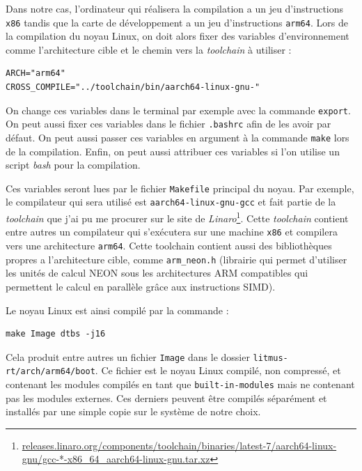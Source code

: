 Dans notre cas, l'ordinateur qui réalisera la compilation a un jeu d'instructions \texttt{x86} tandis que la carte de développement a un jeu d'instructions \texttt{arm64}. Lors de la compilation du noyau Linux, on doit alors fixer des variables d’environnement comme l'architecture cible et le chemin vers la \textit{toolchain} à utiliser : 
\begin{lstlisting}[style=command, caption=Variables pour la compilation croisée du noyau Linux]
ARCH="arm64"
CROSS_COMPILE="../toolchain/bin/aarch64-linux-gnu-"
\end{lstlisting}

On change ces variables dans le terminal par exemple avec la commande \texttt{export}. On peut aussi fixer ces variables dans le fichier \texttt{.bashrc} afin de les avoir par défaut. On peut aussi passer ces variables en argument à la commande \texttt{make} lors de la compilation. Enfin, on peut aussi attribuer ces variables si l'on utilise un script \textit{bash} pour la compilation. 

Ces variables seront lues par le fichier \texttt{Makefile} principal du noyau. Par exemple, le compilateur qui sera utilisé est \texttt{aarch64-linux-gnu-gcc} et fait partie de la \textit{toolchain} que j'ai pu me procurer sur le site de \textit{Linaro}\footnote{\href{https://releases.linaro.org/components/toolchain/binaries/latest-7/aarch64-linux-gnu/gcc-*-x86\_64\_aarch64-linux-gnu.tar.xz}{releases.linaro.org/components/toolchain/binaries/latest-7/aarch64-linux-gnu/gcc-*-x86\_64\_aarch64-linux-gnu.tar.xz}}.
Cette \textit{toolchain} contient entre autres un compilateur qui s'exécutera sur une machine \texttt{x86} et compilera vers une architecture \texttt{arm64}. Cette toolchain contient aussi des bibliothèques propres a l'architecture cible, comme \texttt{arm\_neon.h} (librairie qui permet d'utiliser les unités de calcul NEON sous les architectures ARM compatibles qui permettent le calcul en parallèle grâce aux instructions SIMD).

Le noyau Linux est ainsi compilé par la commande :
\begin{lstlisting}[style=command, caption=Compilation croisée du noyau Linux]
    make Image dtbs -j16
\end{lstlisting}
Cela produit entre autres un fichier \texttt{Image} dans le dossier \texttt{litmus-rt/arch/arm64/boot}. Ce fichier est le noyau Linux compilé, non compressé, et contenant les modules compilés en tant que \texttt{built-in-modules} mais ne contenant pas les modules externes. Ces derniers peuvent être compilés séparément et installés par une simple copie sur le système de notre choix. 


